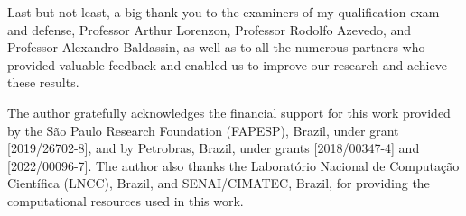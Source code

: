 \documentclass[Ingles,Final]{ic-tese-v3}
\begin{document}
Last but not least, a big thank you to the examiners of my qualification exam and defense, Professor Arthur Lorenzon, Professor Rodolfo Azevedo, and Professor Alexandro Baldassin, as well as to all the numerous partners who provided valuable feedback and enabled us to improve our research and achieve these results.

The author gratefully acknowledges the financial support for this work provided by the São Paulo Research Foundation (FAPESP), Brazil, under grant \mbox{[2019/26702-8]}, and by Petrobras, Brazil, under grants \mbox{[2018/00347-4]} and \mbox{[2022/00096-7]}. The author also thanks the Laboratório Nacional de Computação Científica (LNCC), Brazil, and SENAI/CIMATEC, Brazil, for providing the computational resources used in this work.

\end{document}
